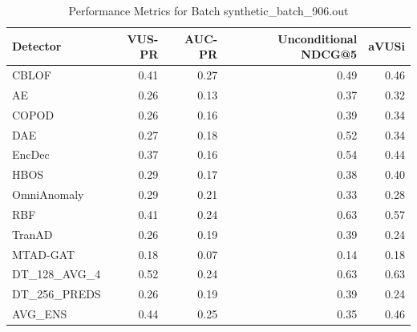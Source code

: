 \begin{table}
\centering
\caption{Performance Metrics for Batch synthetic_batch_906.out}
\label{tab:example_metrics}
\begin{tabular}{lrrrr}
\toprule
    Detector &  VUS-PR &  AUC-PR &  Unconditional NDCG@5 &  aVUSi \\
\midrule
       CBLOF &    0.41 &    0.27 &                  0.49 &   0.46 \\
          AE &    0.26 &    0.13 &                  0.37 &   0.32 \\
       COPOD &    0.26 &    0.16 &                  0.39 &   0.34 \\
         DAE &    0.27 &    0.18 &                  0.52 &   0.34 \\
      EncDec &    0.37 &    0.16 &                  0.54 &   0.44 \\
        HBOS &    0.29 &    0.17 &                  0.38 &   0.40 \\
 OmniAnomaly &    0.29 &    0.21 &                  0.33 &   0.28 \\
         RBF &    0.41 &    0.24 &                  0.63 &   0.57 \\
      TranAD &    0.26 &    0.19 &                  0.39 &   0.24 \\
    MTAD-GAT &    0.18 &    0.07 &                  0.14 &   0.18 \\
DT\_128\_AVG\_4 &    0.52 &    0.24 &                  0.63 &   0.63 \\
DT\_256\_PREDS &    0.26 &    0.19 &                  0.39 &   0.24 \\
     AVG\_ENS &    0.44 &    0.25 &                  0.35 &   0.46 \\
\bottomrule
\end{tabular}
\end{table}
